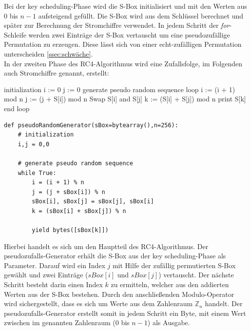 \documentclass[10pt,a4paper]{article}
\begin{document}
Bei der \glqq key scheduling\grqq -Phase wird die S-Box initialisiert und mit den Werten aus 0 bis $n-1$ aufsteigend gefüllt. Die S-Box wird aus dem  Schlüssel berechnet und später zur Berechnung der Stromchiffre verwendet. In jedem Schritt der \textit{for}-Schleife werden zwei Einträge der S-Box vertauscht um eine pseudozufällige Permutation zu erzeugen. Diese lässt sich von einer echt-zufälligen Permutation unterscheiden \ref{ssec:schwäche}.\\
In der zweiten Phase des RC4-Algorithmus wird eine Zufallsfolge, im Folgenden auch Stromchiffre genannt, erstellt:
\begin{center}
\hspace{5pt}
\begin{minipage}[t]{.35\textwidth}
\begin{algorithm}
{initialization}
i := 0
j := 0
{generate pseudo random sequence}
loop
    i := (i + 1) mod n
    j := (j + S[i]) mod n
    Swap S[i] and S[j]
    k := (S[i] + S[j]) mod n
    print S[k]
end loop
\end{algorithm}
\end{minipage}\hspace{0.4cm}
\begin{minipage}[t]{.60\textwidth}
\begin{lstlisting}
def pseudoRandomGenerator(sBox=bytearray(),n=256):
   	# initialization
	i,j = 0,0

	# generate pseudo random sequence
	while True:
   		i = (i + 1) % n
   		j = (j + sBox[i]) % n
   		sBox[i], sBox[j] = sBox[j], sBox[i]
   		k = (sBox[i] + sBox[j]) % n

   		yield bytes([sBox[k]])
\end{lstlisting}
\end{minipage}
\end{center}
Hierbei handelt es sich um den Hauptteil des RC4-Algorithmus. Der pseudozufalls-Generator erhält die S-Box aus der \glqq key scheduling\grqq -Phase als Parameter. Darauf wird ein Index $j$ mit Hilfe der zufällig permutierten S-Box gewählt und zwei Einträge ($sBox[i]$ und $sBox[j]$) vertauscht. Der nächste Schritt besteht darin einen Index $k$ zu ermitteln, welcher aus den addierten Werten aus der S-Box bestehen. Durch den anschließenden Modulo-Operator wird sichergestellt, dass es sich um Werte aus dem Zahlenraum $\mathbb{Z}_n$ handelt. Der pseudozufalls-Generator erstellt somit in jedem Schritt ein Byte, mit einem Wert zwischen im genannten Zahlenraum ($0$ bis $n-1$) als Ausgabe.
\end{document}

